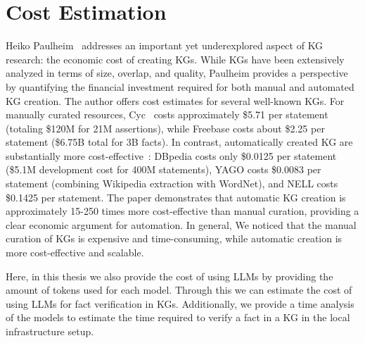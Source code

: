 \section{Cost Estimation}\label{sec:cost-estimation}
Heiko Paulheim~\cite{DBLP:conf/semweb/Paulheim18a} addresses an important yet underexplored aspect of \ac{KG} research: the economic cost of creating \acp{KG}.
While \acp{KG} have been extensively analyzed in terms of size, overlap, and quality, Paulheim provides a perspective by quantifying the financial investment required for both manual and automated \ac{KG} creation.
The author offers cost estimates for several well-known \acp{KG}.
For manually curated resources, Cyc~\cite{10.1145/219717.219745} costs approximately \$5.71 per statement (totaling \$120M for 21M assertions), while Freebase costs about \$2.25 per statement (\$6.75B total for 3B facts).
In contrast, automatically created \ac{KG} are substantially more cost-effective~\cite{One_Knowledge_Graph}: DBpedia costs only \$0.0125 per statement (\$5.1M development cost for 400M statements), YAGO costs \$0.0083 per statement (combining Wikipedia extraction with WordNet), and NELL costs \$0.1425 per statement.
The paper demonstrates that automatic \ac{KG} creation is approximately 15-250 times more cost-effective than manual curation, providing a clear economic argument for automation.
In general, We noticed that the manual curation of \acp{KG} is expensive and time-consuming, while automatic creation is more cost-effective and scalable.

Here, in this thesis we also provide the cost of using \acp{LLM} by providing the amount of tokens used for each model.
Through this we can estimate the cost of using \acp{LLM} for fact verification in \acp{KG}.
Additionally, we provide a time analysis of the models to estimate the time required to verify a fact in a \ac{KG} in the local infrastructure setup.